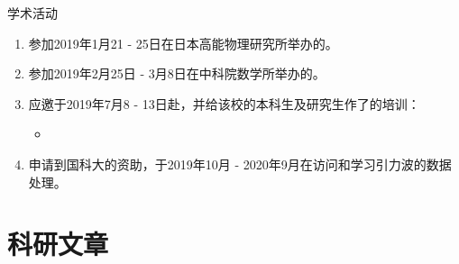 \documentclass[xcolor=dvipsnames]{beamer} %
\newcounter{sauvegardeenumi}
\newcommand{\estart}{\setcounter{enumi}{\thesauvegardeenumi}}
\begin{document}
\begin{frame}{学术活动}
    \begin{enumerate}
        \estart
        \item 参加2019年1月21 - 25日在日本高能物理研究所举办的。
        \vspace{2mm}\pause
        
        \item 参加2019年2月25日 - 3月8日在中科院数学所举办的。
        \vspace{2mm}\pause
        
        \item 应邀于2019年7月8 - 13日赴，并给该校的本科生及研究生作了的培训：
        \begin{itemize}
            \item {}
        \end{itemize}        
        \vspace{2mm}\pause
        
        \item 申请到国科大的资助，于2019年10月 - 2020年9月在访问和学习引力波的数据处理。
	\end{enumerate}
\end{frame}
\section{科研文章}
\subsection{}
\end{document}
